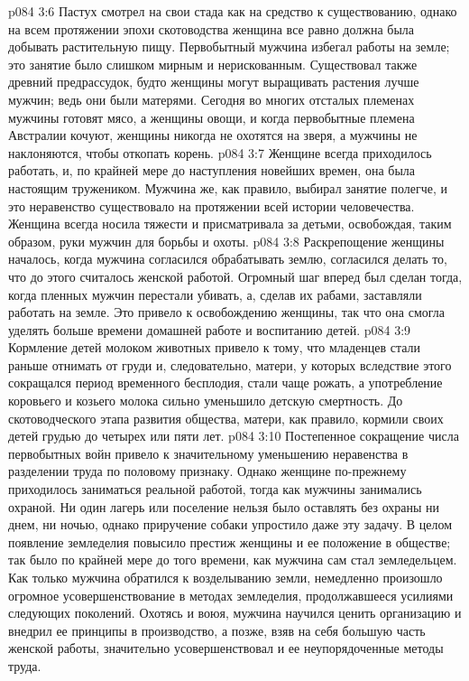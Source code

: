 \vs p084 3:6 \pc Пастух смотрел на свои стада как на средство к существованию, однако на всем протяжении эпохи скотоводства женщина все равно должна была добывать растительную пищу. Первобытный мужчина избегал работы на земле; это занятие было слишком мирным и нерискованным. Существовал также древний предрассудок, будто женщины могут выращивать растения лучше мужчин; ведь они были матерями. Сегодня во многих отсталых племенах мужчины готовят мясо, а женщины овощи, и когда первобытные племена Австралии кочуют, женщины никогда не охотятся на зверя, а мужчины не наклоняются, чтобы откопать корень.
\vs p084 3:7 Женщине всегда приходилось работать, и, по крайней мере до наступления новейших времен, она была настоящим тружеником. Мужчина же, как правило, выбирал занятие полегче, и это неравенство существовало на протяжении всей истории человечества. Женщина всегда носила тяжести и присматривала за детьми, освобождая, таким образом, руки мужчин для борьбы и охоты.
\vs p084 3:8 Раскрепощение женщины началось, когда мужчина согласился обрабатывать землю, согласился делать то, что до этого считалось женской работой. Огромный шаг вперед был сделан тогда, когда пленных мужчин перестали убивать, а, сделав их рабами, заставляли работать на земле. Это привело к освобождению женщины, так что она смогла уделять больше времени домашней работе и воспитанию детей.
\vs p084 3:9 Кормление детей молоком животных привело к тому, что младенцев стали раньше отнимать от груди и, следовательно, матери, у которых вследствие этого сокращался период временного бесплодия, стали чаще рожать, а употребление коровьего и козьего молока сильно уменьшило детскую смертность. До скотоводческого этапа развития общества, матери, как правило, кормили своих детей грудью до четырех или пяти лет.
\vs p084 3:10 Постепенное сокращение числа первобытных войн привело к значительному уменьшению неравенства в разделении труда по половому признаку. Однако женщине по\hyp{}прежнему приходилось заниматься реальной работой, тогда как мужчины занимались охраной. Ни один лагерь или поселение нельзя было оставлять без охраны ни днем, ни ночью, однако приручение собаки упростило даже эту задачу. В целом появление земледелия повысило престиж женщины и ее положение в обществе; так было по крайней мере до того времени, как мужчина сам стал земледельцем. Как только мужчина обратился к возделыванию земли, немедленно произошло огромное усовершенствование в методах земледелия, продолжавшееся усилиями следующих поколений. Охотясь и воюя, мужчина научился ценить организацию и внедрил ее принципы в производство, а позже, взяв на себя большую часть женской работы, значительно усовершенствовал и ее неупорядоченные методы труда.
